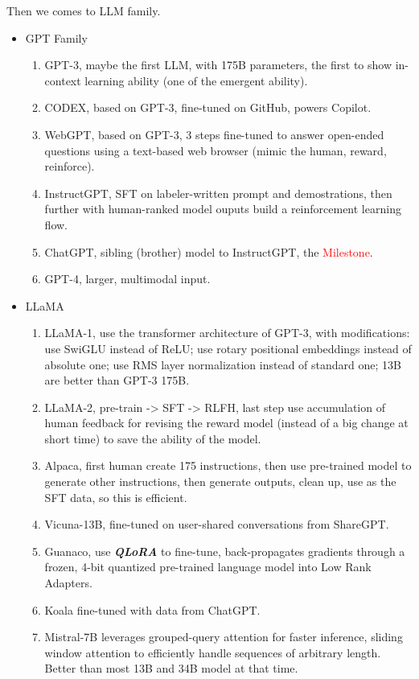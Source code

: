 \documentclass[10pt]{elegantbook}
\newcommand{\mydefination}[1]{\textbf{\textit{\textcolor{structurecolor}{#1}}}}
\begin{document}
Then we comes to LLM family.
\begin{itemize}
    \item GPT Family
    \begin{enumerate}
        \item GPT-3, maybe the first LLM, with 175B parameters, the first to show in-context learning ability (one of the emergent ability).
        \item CODEX, based on GPT-3, fine-tuned on GitHub, powers Copilot.
        \item WebGPT, based on GPT-3, 3 steps fine-tuned to answer open-ended questions using a text-based web browser (mimic the human, reward, reinforce).
        \item InstructGPT, SFT on labeler-written prompt and demostrations, then further with human-ranked model ouputs build a reinforcement learning flow.
        \item ChatGPT, sibling (brother) model to InstructGPT, the \textcolor{red}{Milestone}.
        \item GPT-4, larger, multimodal input.
    \end{enumerate}

    \item LLaMA
    \begin{enumerate}
        \item LLaMA-1, use the transformer architecture of GPT-3, with modifications: use SwiGLU instead of ReLU; use rotary positional embeddings instead 
    of absolute one; use RMS layer normalization instead of standard one; 13B are better than GPT-3 175B.
        \item LLaMA-2, pre-train -> SFT -> RLFH, last step use accumulation of human feedback for revising the reward model (instead of a big change at short
    time) to save the ability of the model.
        \item Alpaca, first human create 175 instructions, then use pre-trained model to generate other instructions, then generate outputs, clean up, use as
    the SFT data, so this is efficient.
        \item Vicuna-13B, fine-tuned on user-shared conversations from ShareGPT.
        \item Guanaco, use \mydefination{QLoRA} to fine-tune, back-propagates gradients through a frozen, 4-bit quantized pre-trained language model into Low Rank Adapters.
        \item Koala fine-tuned with data from ChatGPT.
        \item Mistral-7B leverages grouped-query attention for faster inference, sliding window attention to efficiently handle sequences of arbitrary length.
    Better than most 13B and 34B model at that time.
    \end{enumerate}


\end{itemize}
\end{document}
